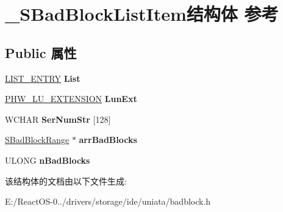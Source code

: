 \hypertarget{struct___s_bad_block_list_item}{}\section{\+\_\+\+S\+Bad\+Block\+List\+Item结构体 参考}
\label{struct___s_bad_block_list_item}
\subsection*{Public 属性}
\begin{DoxyCompactItemize}
\item 
\mbox{\label{struct___s_bad_block_list_item_aeaffb477043889b50a3fad7cbd16b478}} 
\hyperlink{struct___l_i_s_t___e_n_t_r_y}{L\+I\+S\+T\+\_\+\+E\+N\+T\+RY} {\bfseries List}
\item 
\mbox{\label{struct___s_bad_block_list_item_a5ac01e9db47d2fd4df007d9b3cb9e125}} 
\hyperlink{struct___h_w___l_u___e_x_t_e_n_s_i_o_n}{P\+H\+W\+\_\+\+L\+U\+\_\+\+E\+X\+T\+E\+N\+S\+I\+ON} {\bfseries Lun\+Ext}
\item 
\mbox{\label{struct___s_bad_block_list_item_a433eb0e2a365b8323ebff67c0fc5048a}} 
W\+C\+H\+AR {\bfseries Ser\+Num\+Str} \mbox{[}128\mbox{]}
\item 
\mbox{\label{struct___s_bad_block_list_item_a43e2fb679deb9d14d79eba447eab237d}} 
\hyperlink{struct___s_bad_block_range}{S\+Bad\+Block\+Range} $\ast$ {\bfseries arr\+Bad\+Blocks}
\item 
\mbox{\label{struct___s_bad_block_list_item_a6b1acf78485e5a3d431a7bc5e2ab9807}} 
U\+L\+O\+NG {\bfseries n\+Bad\+Blocks}
\end{DoxyCompactItemize}


该结构体的文档由以下文件生成\+:\begin{DoxyCompactItemize}
\item 
E\+:/\+React\+O\+S-\/0../drivers/storage/ide/uniata/badblock.\+h\end{DoxyCompactItemize}
